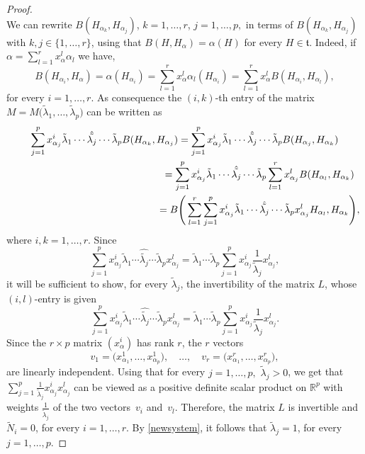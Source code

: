 \documentclass[pdftex]{sigma}
\numberwithin{equation}{section}
\begin{document}
\begin{proof}
\[\]
We can rewrite $B(H_{\alpha_k}, H_{\alpha_j})$, $k =1, \dots, r$, $j = 1, \dots, p,$ in terms of $B(H_{\alpha_k}, H_{\alpha_j})$ with $k, j \in \{1, \dots, r \}$, using
 that $B (H, H_{\alpha}) = \alpha (H)$ for every $H \in \mathfrak t$. Indeed, if $\alpha = \sum_{l=1}^r x_{\alpha}^l \alpha_l$ we have,
\[
B (H_{\alpha_i}, H_{\alpha}) = \alpha (H_{\alpha_i}) =
 \sum_{l=1}^r x_{\alpha}^l \alpha_l (H_{\alpha_i}) = \sum_{l=1}^r x_{\alpha}^l B(H_{\alpha_i}, H_{\alpha_l}),
\]
 for every $i = 1, \dots, r$.
 As consequence the $(i,k)$-th entry of the matrix $M = M\big(\tilde \lambda_1, \dots, \tilde \lambda_p\big)$ can be written as
\begin{gather*}
\sum_{j=1}^p x_{\alpha_j}^i \tilde \lambda_1 \cdots \hat{\tilde {\lambda_j}} \cdots \tilde \lambda _p B(H_{\alpha_k}, H_{\alpha_j}) = \sum_{j=1}^p x_{\alpha_j}^i \tilde \lambda_1 \cdots \hat{\tilde {\lambda_j}} \cdots \tilde \lambda _p B(H_{\alpha_j}, H_{\alpha_k})\\
\hphantom{\sum_{j=1}^p x_{\alpha_j}^i \tilde \lambda_1 \cdots \hat{\tilde {\lambda_j}} \cdots \tilde \lambda _p B(H_{\alpha_k}, H_{\alpha_j})}{} = \sum_{j=1}^p x_{\alpha_j}^i \tilde \lambda_1 \cdots \hat{\tilde {\lambda_j}} \cdots \tilde \lambda _p \sum_{l=1}^r x_{\alpha_j}^l B(H_{\alpha_l}, H_{\alpha_k})\\
 \hphantom{\sum_{j=1}^p x_{\alpha_j}^i \tilde \lambda_1 \cdots \hat{\tilde {\lambda_j}} \cdots \tilde \lambda _p B(H_{\alpha_k}, H_{\alpha_j})}{} = B\Bigg( \sum_{l=1}^r \sum_{j=1}^p x_{\alpha_j}^i \tilde \lambda_1 \cdots \hat{\tilde {\lambda_j}} \cdots \tilde \lambda _p x_{\alpha_j}^l H_{\alpha_l}, H_{\alpha_k}\Bigg),
\end{gather*}
where $i , k = 1, \dots, r$. Since
\[
 \sum_{j=1}^p x_{\alpha_j}^i \tilde \lambda_1 \cdots \hat{\tilde {\lambda_j}} \cdots \tilde \lambda _p x_{\alpha_j}^l = \tilde \lambda_1 \cdots \tilde \lambda_p \sum_{j=1}^p x_{\alpha_j}^i \frac{1} { \tilde \lambda_j} x_{\alpha_j}^l,
\]
 it will be sufficient to show, for every $ \tilde \lambda_j$, the invertibility of the matrix $L$, whose $(i,l)$-entry is given
\[
 \sum_{j=1}^p x_{\alpha_j}^i \tilde \lambda_1 \cdots \hat{\tilde {\lambda_j}} \cdots \tilde \lambda _p x_{\alpha_j}^l = \tilde \lambda_1 \cdots \tilde \lambda_p \sum_{j=1}^p x_{\alpha_j}^i \frac{1} {\tilde \lambda_j} x_{\alpha_j}^l.
\]
Since the $r \times p$ matrix $(x_{\alpha}^i)$ has rank $r$, the $r$ vectors
\[
v_1 = \big(x^1_{\alpha_1}, \dots, x^1_{\alpha_p}\big), \quad \dots, \quad v_r = \big(x^r_{\alpha_1}, \dots, x^r_{\alpha_p}\big),
\]
are linearly independent. Using that for every $j=1, \dots, p,$ $ \tilde \lambda_j > 0$, we get that $\sum_{j=1}^p \frac{1} { \tilde \lambda_j} x_{\alpha_j}^i x_{\alpha_j}^l $ can be viewed as a positive definite scalar product on $\mathbb R^p$ with weights $\frac{1}{ \tilde \lambda_j}$ of the two vectors~$v_i$ and~$v_l$. Therefore,
the matrix $L$ is invertible and $\tilde N_i =0$, for every $i = 1, \dots, r$. By \eqref{newsystem}, it follows that $\tilde \lambda_j = 1$, for every $j =1, \dots, p$.
\end{proof}
\end{document}
